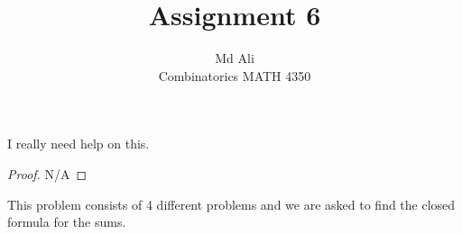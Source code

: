 \documentclass[12pt]{article}
\newenvironment{problem}[2][Problem]{\begin{trivlist}
\item[\hskip \labelsep {\bfseries #1}\hskip \labelsep {\bfseries #2.}]}{\end{trivlist}}
\begin{document}
 
 
\title{Assignment 6}%
\author{Md Ali\\ %
Combinatorics MATH 4350} %
 
\maketitle
 
\begin{problem}{1} %
I really need help on this. 
\end{problem}
 
\begin{proof}
N/A
\end{proof}

\begin{problem}{2}
This problem consists of 4 different problems and we are asked to find the closed formula for the sums. 
\end{problem}
\end{document}

